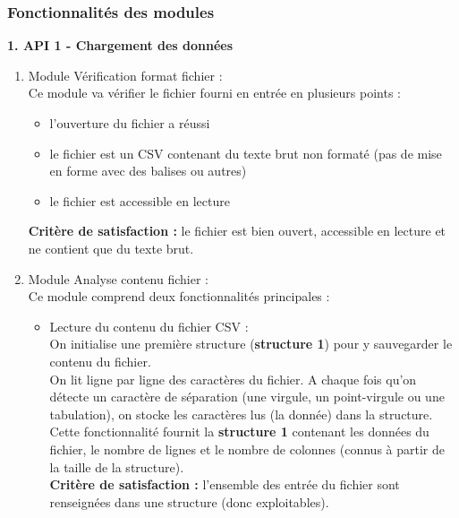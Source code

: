 			\subsubsection{Fonctionnalités des modules}
			\begin{description}[style=unboxed,leftmargin=0.2cm]
			
				\item\textbf{1. API 1 - Chargement des données}
				\begin{enumerate}
					\item Module Vérification format fichier :\\
					Ce module va vérifier le fichier fourni en entrée en plusieurs points :
					\begin{itemize}
						\item l'ouverture du fichier a réussi
						\item le fichier est un CSV contenant du texte brut non formaté (pas de mise en forme avec des balises ou autres)
						\item le fichier est accessible en lecture
					\end{itemize}
					\textbf{Critère de satisfaction : } le fichier est bien ouvert, accessible en lecture et ne contient que du texte brut.
				
					\item Module Analyse contenu fichier :\\
					Ce module comprend deux fonctionnalités principales :
					\begin{itemize}
						\item Lecture du contenu du fichier CSV :\\
						On initialise une première structure (\textbf{structure 1}) pour y sauvegarder le contenu du fichier.\\
						On lit ligne par ligne des caractères du fichier. A chaque fois qu'on détecte un caractère de séparation (une virgule, un point-virgule ou une tabulation), on stocke les caractères lus (la donnée) dans la structure.\\
						Cette fonctionnalité fournit la \textbf{structure 1} contenant les données du fichier, le nombre de lignes et le nombre de colonnes (connus à partir de la taille de la structure).\\
						\textbf{Critère de satisfaction : } l'ensemble des entrée du fichier sont renseignées dans une structure (donc exploitables).
						

\end{itemize}
\end{enumerate}
\end{description}
